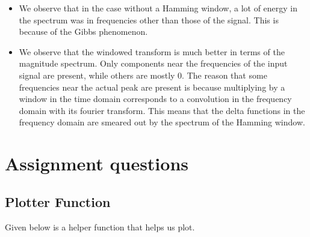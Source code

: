 \documentclass[11pt, a4paper]{article}
\begin{document}
\begin{itemize}
    \item
      We observe that in the case without a Hamming window, a lot of energy
      in the spectrum was in frequencies other than those of the signal.
      This is because of the Gibbs phenomenon.
    \item
      We observe that the windowed transform is much better in terms of the
      magnitude spectrum. Only components near the frequencies of the input
      signal are present, while others are mostly 0. The reason that some
      frequencies near the actual peak are present is because multiplying by
      a window in the time domain corresponds to a convolution in the
      frequency domain with its fourier transform. This means that the delta
      functions in the frequency domain are smeared out by the spectrum of
      the Hamming window.
\end{itemize}
    
    

\section{Assignment questions}

\subsection{Plotter Function}
Given below is a helper function that helps us plot.
\end{document}
